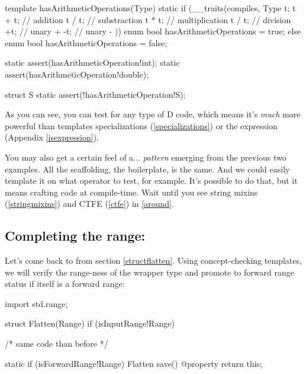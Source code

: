\begin{dcode}
template hasArithmeticOperations(Type)
{
    static if (__traits(compiles, 
                       {   
                           Type t;
                           t + t; // addition
                           t / t; // substraction
                           t * t; // multiplication
                           t / t; // division
                           +t;    // unary +
                           -t;    // unary -
                       }))
        enum bool hasArithmeticOperations = true;
    else
        enum bool hasArithmeticOperations = false;
}

static assert(hasArithmeticOperation!int);
static assert(hasArithmeticOperation!double);

struct S {}
static assert(!hasArithmeticOperation!S);
\end{dcode}

As you can see, you can test for any type of D code, which means it's \emph{much} more powerful than templates specializations (\ref{specializations}) or the  expression (Appendix \ref{isexpression}).

You may also get a certain feel of a... \emph{pattern} emerging from the previous two examples. All the scaffolding, the boilerplate, is the same. And we could easily template it on what operator to test, for example. It's possible to do that, but it means crafting code at compile-time. Wait until you see string mixins (\ref{stringmixins}) and CTFE (\ref{ctfe}) in \autoref{around}.

\subsection{Completing the  range:} 

Let's come back to  from section \ref{structflatten}. Using concept-checking templates, we will verify the range-ness of the wrapper type and promote  to forward range status if  itself is a forward range:

\begin{dcode}
import std.range;

struct Flatten(Range) if (isInputRange!Range)
{
    /* same code than before */

    static if (isForwardRange!Range)
        Flatten save() @property
        {
           return this;
        }
}
\end{dcode}

